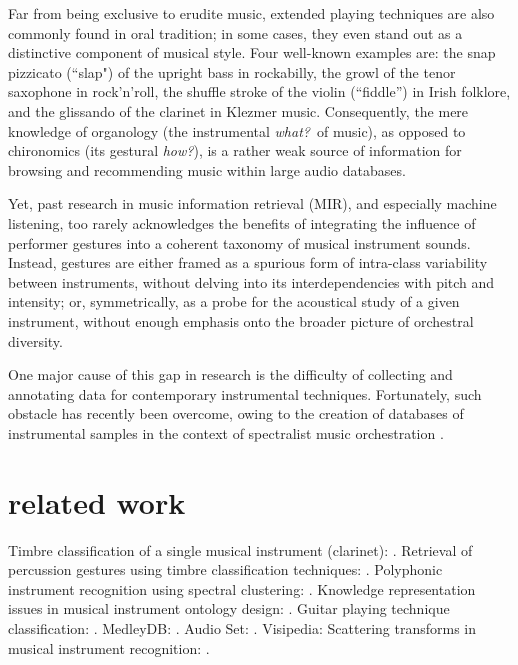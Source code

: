 \documentclass{article}
\begin{document}
Far from being exclusive to erudite music, extended playing techniques are also commonly found in oral tradition; in some cases, they even stand out as a distinctive component of musical style.
Four well-known examples are:
the snap pizzicato (``slap") of the upright bass in rockabilly,
the growl of the tenor saxophone in rock'n'roll,
the shuffle stroke of the violin (``fiddle'') in Irish folklore,
and the glissando of the clarinet in Klezmer music.
Consequently, the mere knowledge of organology (the instrumental \emph{what?}~of music), as opposed to chironomics (its gestural \emph{how?}), is a rather weak source of information for browsing and recommending music within large audio databases.

Yet, past research in music information retrieval (MIR), and especially machine listening, too rarely acknowledges the benefits of integrating the influence of performer gestures into a coherent taxonomy of musical instrument sounds.
Instead, gestures are either framed as a spurious form of intra-class variability between instruments, without delving into its interdependencies with pitch and intensity;
or, symmetrically, as a probe for the acoustical study of a given instrument, without enough emphasis onto the broader picture of orchestral diversity.

One major cause of this gap in research is the difficulty of collecting and annotating data for contemporary instrumental techniques.
Fortunately, such obstacle has recently been overcome, owing to the creation of databases of instrumental samples in the context of spectralist music orchestration \cite{maresz2013cmr}.

\section{related work}

Timbre classification of a single musical instrument (clarinet): \cite{loureiro2004ismir}.
Retrieval of percussion gestures using timbre classification techniques: \cite{tindale2004ismir}.
Polyphonic instrument recognition using spectral clustering: \cite{martins2007ismir}.
Knowledge representation issues in musical instrument ontology design: \cite{kolozali2011ismir}.
Guitar playing technique classification: \cite{su2014ismir}.
MedleyDB: \cite{bittner2014ismir}.
Audio Set: \cite{gemmeke2017icassp}.
Visipedia: \cite{belongie2015pattern}
Scattering transforms in musical instrument recognition: \cite{tjoa2010ismir,lostanlen2017phd}.
\end{document}
